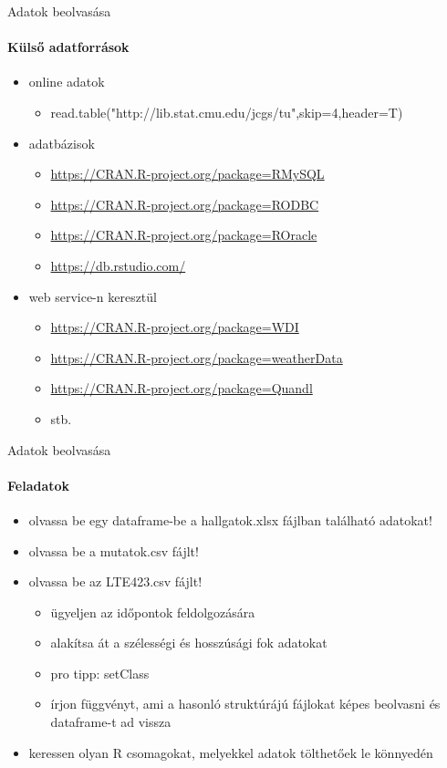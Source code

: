\documentclass[10pt]{beamer}
\begin{document}
\begin{frame}{Adatok beolvasása}
\framesubtitle{Külső adatforrások}
\begin{itemize}
\item online adatok
\begin{itemize}
\item read.table("http://lib.stat.cmu.edu/jcgs/tu",skip=4,header=T)
\end{itemize}
\item adatbázisok
\begin{itemize}
\item \url{https://CRAN.R-project.org/package=RMySQL}
\item \url{https://CRAN.R-project.org/package=RODBC}
\item \url{https://CRAN.R-project.org/package=ROracle}
\item \url{https://db.rstudio.com/}
\end{itemize}
\item web service-n keresztül
\begin{itemize}
\item \url{https://CRAN.R-project.org/package=WDI}
\item \url{https://CRAN.R-project.org/package=weatherData}
\item \url{https://CRAN.R-project.org/package=Quandl}
\item stb.
\end{itemize}
\end{itemize}
\end{frame}

\begin{frame}{Adatok beolvasása}
\framesubtitle{Feladatok}
\begin{itemize}
\item olvassa be egy dataframe-be a hallgatok.xlsx fájlban található adatokat!
\item olvassa be a mutatok.csv fájlt!
\item olvassa be az LTE423.csv fájlt!
\begin{itemize}
\item ügyeljen az időpontok feldolgozására
\item alakítsa át a szélességi és hosszúsági fok adatokat
\item pro tipp: setClass
\item írjon függvényt, ami a hasonló struktúrájú fájlokat képes beolvasni és dataframe-t ad vissza
\end{itemize}
\item keressen olyan R csomagokat, melyekkel adatok tölthetőek le könnyedén
\end{itemize}
\end{frame}
\end{document}
